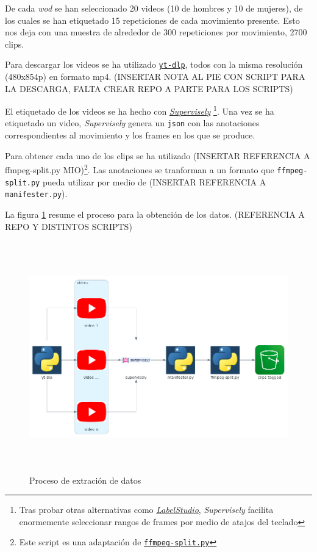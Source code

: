 De cada \textit{wod} se han seleccionado 20 videos (10 de hombres y 10 de mujeres), de los cuales se han etiquetado 15 repeticiones de cada movimiento presente. Esto nos deja con una muestra de alrededor de 300 repeticiones por movimiento, 2700 clips.

Para descargar los videos se ha utilizado \href{https://github.com/yt-dlp/yt-dlp}{\texttt{yt-dlp}}, todos con la misma resolución (480x854p) en formato mp4. (INSERTAR NOTA AL PIE CON SCRIPT PARA LA DESCARGA, FALTA CREAR REPO A PARTE PARA LOS SCRIPTS)

El etiquetado de los videos se ha hecho con \href{https://supervise.ly/}{\textit{Supervisely}} \footnote{Tras probar otras alternativas como \href{https://labelstud.io/}{\textit{LabelStudio}}, \textit{Supervisely} facilita enormemente seleccionar rangos de frames por medio de atajos del teclado}.
Una vez se ha etiquetado un video, \textit{Supervisely} genera un \texttt{json} con las anotaciones correspondientes al movimiento y los frames en los que se produce.

Para obtener cada uno de los clips se ha utilizado (INSERTAR REFERENCIA A ffmpeg-split.py MIO)\footnote{Este script es una adaptación de \href{https://github.com/c0decracker/video-splitter}{\texttt{ffmpeg-split.py}}}. Las anotaciones se tranforman a un formato que \texttt{ffmpeg-split.py} pueda utilizar por medio de (INSERTAR REFERENCIA A \texttt{manifester.py}).

La figura \ref{data_extraction_process} resume el proceso para la obtención de los datos. (REFERENCIA A REPO Y DISTINTOS SCRIPTS)


\begin{figure}[H]
    \centering
		\includegraphics[height=10cm, width=12cm]{figs/data_extraction_process_.png}
\caption{Proceso de extración de datos}\label{data_extraction_process}
\end{figure}


